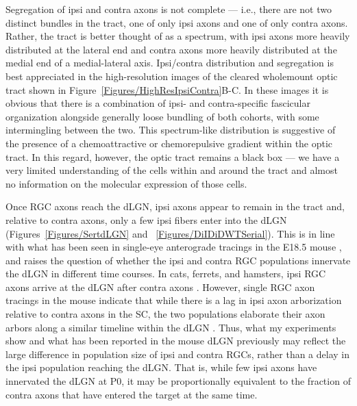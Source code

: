 Segregation of ipsi and contra axons is not complete --- i.e., there are not two distinct bundles in the tract, one of only ipsi axons and one of only contra axons.
Rather, the tract is better thought of as a spectrum, with ipsi axons more heavily distributed at the lateral end and contra axons more heavily distributed at the medial end of a medial-lateral axis.
Ipsi/contra distribution and segregation is best appreciated in the high-resolution images of the cleared wholemount optic tract shown in Figure~\ref{Figures/HighResIpsiContra}B-C.
In these images it is obvious that there is a combination of ipsi- and contra-specific fascicular organization alongside generally loose bundling of both cohorts, with some intermingling between the two.
This spectrum-like distribution is suggestive of the presence of a chemoattractive or chemorepulsive gradient within the optic tract.
In this regard, however, the optic tract remains a black box --- we have a very limited understanding of the cells within and around the tract and almost no information on the molecular expression of those cells.

Once RGC axons reach the dLGN, ipsi axons appear to remain in the tract and, relative to contra axons, only a few ipsi fibers enter into the dLGN (Figures~\ref{Figures/SertdLGN} and ~\ref{Figures/DiIDiDWTSerial}).
This is in line with what has been seen in single-eye anterograde tracings in the E18.5 mouse \cite{godement1984prenatal}, and raises the question of whether the ipsi and contra RGC populations innervate the dLGN in different time courses.
In cats, ferrets, and hamsters, ipsi RGC axons arrive at the dLGN after contra axons \cite{frost1979postnatal,linden1981dorsal,shatz1983prenatal}.
However, single RGC axon tracings in the mouse indicate that while there is a lag in ipsi axon arborization relative to contra axons in the SC, the two populations elaborate their axon arbors along a similar timeline within the dLGN \cite{dhande2011development}.
Thus, what my experiments show and what has been reported in the mouse dLGN previously \cite{godement1984prenatal} may reflect the large difference in population size of ipsi and contra RGCs, rather than a delay in the ipsi population reaching the dLGN.
That is, while few ipsi axons have innervated the dLGN at P0, it may be proportionally equivalent to the fraction of contra axons that have entered the target at the same time.